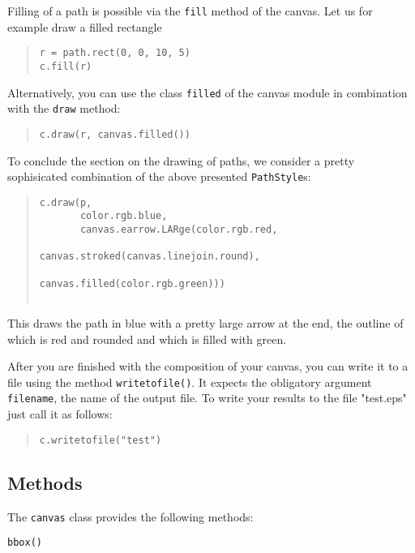 Filling of a path is possible via the \verb|fill| method of the canvas.
Let us for example draw a filled rectangle 
\begin{quote}
\begin{verbatim}
r = path.rect(0, 0, 10, 5)
c.fill(r)
\end{verbatim}
\end{quote}
Alternatively, you can use the class \verb|filled| of the canvas module
in combination with the \verb|draw| method:
\begin{quote}
\begin{verbatim}
c.draw(r, canvas.filled())
\end{verbatim}
\end{quote}

To conclude the section on the drawing of paths, we consider a pretty
sophisicated combination of the above presented \verb|PathStyle|s:
\begin{quote}
\begin{verbatim}
c.draw(p, 
       color.rgb.blue, 
       canvas.earrow.LARge(color.rgb.red,
                           canvas.stroked(canvas.linejoin.round),
                                          canvas.filled(color.rgb.green)))
                                                              
\end{verbatim}
\end{quote}
This draws the path in blue with a pretty large arrow at the end, the outline
of which is red and rounded and which is filled with green.

After you are finished with the composition of your canvas, you can
write it to a file using the method \verb|writetofile()|. It expects the
obligatory argument \verb|filename|, the name of the output
file. To write your results to the file "test.eps" just call it as follows:
\begin{quote}
\begin{verbatim}
c.writetofile("test")
\end{verbatim}
\end{quote}


\subsection{Methods}



The \verb|canvas| class provides the following methods:


\verb|bbox()| 

